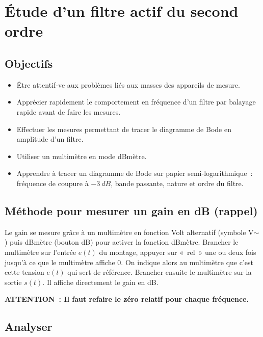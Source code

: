 \documentclass[a4paper, 11pt, final, garamond]{book}
\begin{document}
\setcounter{chapter}{13}

\chapter{\'Etude d'un filtre actif du second ordre}

\section{Objectifs}

\begin{itemize}
    \item Être attentif-ve aux problèmes liés aux masses des appareils de
        mesure. 
    \item Apprécier rapidement le comportement en fréquence d'un filtre par
        balayage rapide avant de faire les mesures. 
    \item Effectuer les mesures permettant de tracer le diagramme de Bode en
        amplitude d'un filtre.
    \item Utiliser un multimètre en mode dBmètre.
    \item Apprendre à tracer un diagramme de Bode sur papier
        semi-logarithmique~: fréquence de coupure à $-\SI{3}{dB}$, bande
        passante, nature et ordre du filtre. 
\end{itemize}


\section{Méthode pour mesurer un gain en dB (rappel)}

Le gain se mesure grâce à un multimètre en fonction Volt alternatif (symbole
V$\sim$) puis dBmètre (bouton dB) pour activer la fonction dBmètre. Brancher le
multimètre sur l'entrée $e(t)$ du montage, appuyer sur «~rel~» une ou deux fois
jusqu'à ce que le multimètre affiche 0. On indique alors au multimètre que c'est
cette tension $e(t)$ qui sert de référence. Brancher ensuite le multimètre sur
la sortie $s(t)$. Il affiche directement le gain en dB.

\begin{brapp}{}
    \centering
    \textbf{ATTENTION~: Il faut refaire le zéro relatif pour chaque fréquence.}
\end{brapp}

\section{Analyser}
\end{document}
